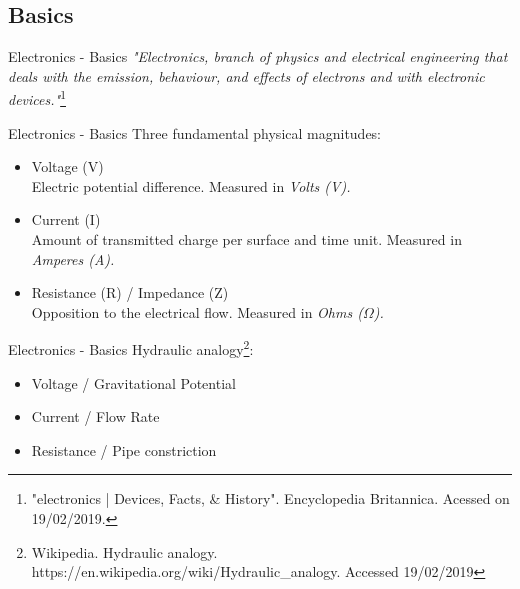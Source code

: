 \documentclass{beamer}
\begin{document}
\subsection{Basics}

\begin{frame}{Electronics - Basics}
    \textit{"Electronics, branch of physics and electrical engineering that deals with the emission, behaviour, and effects of electrons and with electronic devices."}\footnote{"electronics | Devices, Facts, \& History". Encyclopedia Britannica. Acessed on 19/02/2019.}
\end{frame}

\begin{frame}{Electronics - Basics}
    Three fundamental physical magnitudes:
    \begin{itemize}
        \item Voltage (V) \\Electric potential difference. Measured in \textit{Volts (V).}
        \item Current (I)\\Amount of transmitted charge per surface and time unit.  Measured in \textit{Amperes (A).}
        \item Resistance (R) / Impedance (Z) \\Opposition to the electrical flow. Measured in \textit{Ohms ($\Omega$).}
    \end{itemize}
\end{frame}

\begin{frame}{Electronics - Basics}
    Hydraulic analogy\footnote{Wikipedia. Hydraulic analogy. https://en.wikipedia.org/wiki/Hydraulic\_analogy. Accessed 19/02/2019}:
    \begin{itemize}
        \item Voltage / Gravitational Potential
        \item Current / Flow Rate
        \item Resistance / Pipe constriction
    \end{itemize}
\end{frame}
\end{document}
